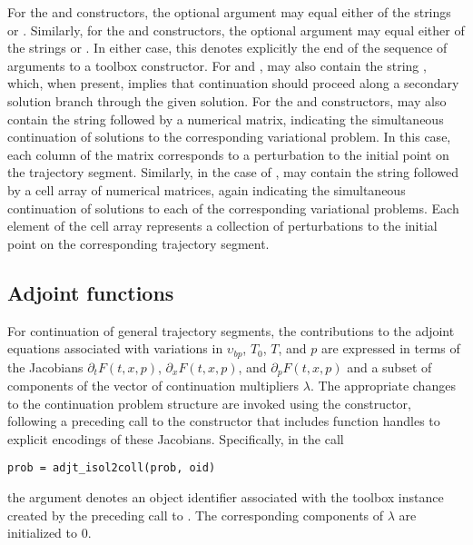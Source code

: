 For the  and  constructors, the optional  argument may equal either of the strings  or . Similarly, for the  and  constructors, the optional  argument may equal either of the strings  or . In either case, this denotes explicitly the end of the sequence of arguments to a  toolbox constructor. For  and ,  may also contain the string , which, when present, implies that continuation should proceed along a secondary solution branch through the given solution. For the  and  constructors,  may also contain the string  followed by a numerical matrix, indicating the simultaneous continuation of solutions to the corresponding variational problem. In this case, each column of the matrix corresponds to a perturbation to the initial point on the trajectory segment. Similarly, in the case of ,  may contain the string  followed by a cell array of numerical matrices, again indicating the simultaneous continuation of solutions to each of the corresponding variational problems. Each element of the cell array represents a collection of perturbations to the initial point on the corresponding trajectory segment.

\subsection{Adjoint functions}
For continuation of general trajectory segments, the contributions to the adjoint equations associated with variations in $\upsilon_{bp}$, $T_0$, $T$, and $p$ are expressed in terms of the Jacobians $\partial_t F(t,x,p)$, $\partial_x F(t,x,p)$, and $\partial_p F(t,x,p)$ and a subset of components of the vector of continuation multipliers $\lambda$. The appropriate changes to the continuation problem structure are invoked using the  constructor, following a preceding call to the  constructor that includes function handles to explicit encodings of these Jacobians.  Specifically, in the call
\begin{lstlisting}[language=coco-highlight]
prob = adjt_isol2coll(prob, oid)
\end{lstlisting}
the  argument denotes an object identifier associated with the toolbox instance created by the preceding call to . The corresponding components of $\lambda$ are initialized to $0$.

